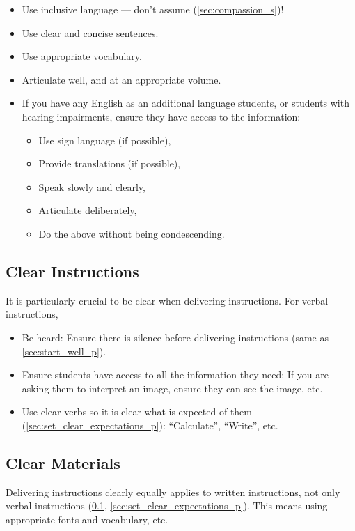 \documentclass[12pt]{report}
\begin{document}
\begin{itemize}
  \item Use inclusive language --- don't assume (\ref{sec:compassion_s})!
  \item Use clear and concise sentences.
  \item Use appropriate vocabulary.
  \item Articulate well, and at an appropriate volume.
  \item If you have any English as an additional language students, or students with hearing impairments, ensure they have access to the information: 
  \begin{itemize}
    \item Use sign language (if possible), 
    \item Provide translations (if possible), 
    \item Speak slowly and clearly, 
    \item Articulate deliberately,
    \item Do the above without being condescending.
  \end{itemize}
\end{itemize}

\subsection{Clear Instructions}
\label{sec:clear_instructions_p}

It is particularly crucial to be clear when delivering instructions. For verbal instructions,
\begin{itemize}
  \item Be heard: Ensure there is silence before delivering instructions (same as \ref{sec:start_well_p}).
  \item Ensure students have access to all the information they need: If you are asking them to interpret an image, ensure they can see the image, etc. 
  \item Use clear verbs so it is clear what is expected of them (\ref{sec:set_clear_expectations_p}): ``Calculate'', ``Write'', etc.
\end{itemize}

\subsection{Clear Materials}
\label{sec:clear_materials_p}

Delivering instructions clearly equally applies to written instructions, not only verbal instructions (\ref{sec:clear_instructions_p}, \ref{sec:set_clear_expectations_p}). This means using appropriate fonts and vocabulary, etc.
\end{document}
